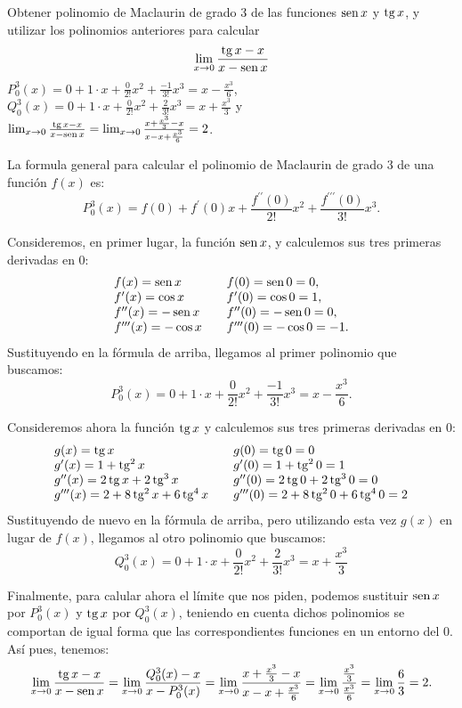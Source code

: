 {Obtener polinomio de Maclaurin de grado 3 de las funciones $\operatorname{sen} x$ y $\operatorname{tg} x$, y utilizar los polinomios anteriores para calcular
\[
\lim_{x\rightarrow 0}\frac{\operatorname{tg} x-x}{x-\operatorname{sen} x}
\]
}
{$P_{0}^{3}(x)=0+1\cdot x+\frac{0}{2!}x^{2}+\frac{-1}{3!}x^{3}=x-\frac{x^{3}}{6}$,\\
$Q_{0}^{3}(x)=0+1\cdot x+\frac{0}{2!}x^{2}+\frac{2}{3!}x^{3}=x+\frac{x^{3}}{3}$ y \\
$\lim_{x\rightarrow 0}\frac{\operatorname{tg} x-x}{x-\operatorname{sen} x} = \lim_{x\rightarrow 0}\frac{x+\frac{x^{3}}{3}-x}{x-x+\frac{x^{3}}{6}} =2$.
}
{La formula general para calcular el polinomio de Maclaurin de grado 3 de una función $f(x)$ es:
\[
P_{0}^{3}(x)=f(0)+f^{\prime }(0)x+\frac{f^{\prime \prime }(0)}{2!}x^{2}+\frac{f^{\prime \prime \prime }(0)}{3!}x^{3}.
\]

Consideremos, en primer lugar, la función $\operatorname{sen} x$, y calculemos sus tres primeras derivadas en 0:
\[
\begin{array}{lll}
f(x)=\operatorname{sen} x &  & f(0)=\operatorname{sen} 0=0, \\
f^{\prime }(x)=\cos x &  & f^{\prime }(0)=\cos 0=1, \\
f^{\prime \prime }(x)=-\operatorname{sen} x &  & f^{\prime \prime }(0)=-\operatorname{sen}0=0, \\
f^{\prime \prime \prime }(x)=-\cos x &  & f^{\prime \prime \prime }(0)=-\cos 0=-1.
\end{array}
\]
Sustituyendo en la fórmula de arriba, llegamos al primer polinomio que buscamos:
\[
P_{0}^{3}(x)=0+1\cdot x+\frac{0}{2!}x^{2}+\frac{-1}{3!}x^{3}=x-\frac{x^{3}}{6}.
\]

Consideremos ahora la función $\operatorname{tg} x$ y calculemos sus tres primeras derivadas en 0:
\[
\begin{array}{lll}
g(x)=\operatorname{tg} x &  & g(0)=\operatorname{tg} 0=0 \\
g^{\prime }(x)=1+\operatorname{tg}^{2} x &  & g^{\prime }(0)=1+\operatorname{tg}^{2} 0=1 \\
g^{\prime \prime }(x)= 2\operatorname{tg} x+2\operatorname{tg} ^{3}x &  & g^{\prime \prime}(0)= 2\operatorname{tg} 0+2\operatorname{tg} ^{3}0=0 \\
g^{\prime \prime \prime }(x)=2+ 8\operatorname{tg} ^{2}x+6\operatorname{tg} ^{4}x &  & g^{\prime \prime \prime }(0)= 2+ 8\operatorname{tg} ^{2}0+6\operatorname{tg} ^{4}0=2
\end{array}
\]
Sustituyendo de nuevo en la fórmula de arriba, pero utilizando esta vez $g(x)$ en lugar de $f(x)$, llegamos al otro polinomio que buscamos:
\[
Q_{0}^{3}(x)=0+1\cdot x+\frac{0}{2!}x^{2}+\frac{2}{3!}x^{3}=x+\frac{x^{3}}{3}
\]

Finalmente, para calular ahora el límite que nos piden, podemos sustituir $\operatorname{sen} x$ por $P_{0}^{3}(x)$ y $\operatorname{tg} x$ por $Q_{0}^{3}(x)$, teniendo en cuenta dichos polinomios se comportan de igual forma que las correspondientes funciones en un entorno del 0. Así pues, tenemos:
\[
\lim_{x\rightarrow 0}\frac{\operatorname{tg} x-x}{x-\operatorname{sen} x} = \lim_{x\rightarrow 0}\frac{Q_{0}^{3}(x)-x}{x-P_{0}^{3}(x)} = \lim_{x\rightarrow 0}\frac{x+\frac{x^{3}}{3}-x}{x-x+\frac{x^{3}}{6}} = \lim_{x\rightarrow 0}\frac{\frac{x^{3}}{3}}{\frac{x^{3}}{6}} = \lim_{x\rightarrow 0}\frac{6}{3}=2.
\]
}
